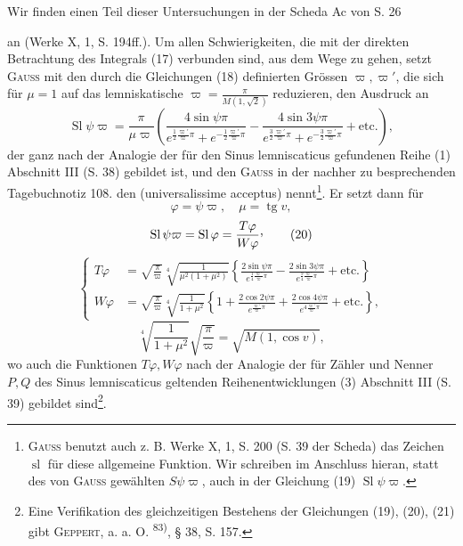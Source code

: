 Wir finden einen Teil dieser Untersuchungen in der Scheda Ac von S. 26\par
\clearpage{}
\HistoricalFoot{}{10\textsuperscript{\(\ast\)}}
\noindent an (Werke X, 1, S. 194ff.). Um allen Schwierigkeiten, die mit der direkten Betrachtung des Integrals (17) verbunden sind, aus dem Wege zu gehen, setzt \textsc{Gauss}
mit den durch die Gleichungen (18) definierten Grössen \(\varpi,\varpi'\), die sich für \(\mu=1\)
auf das lemniskatische \(\varpi=\frac\pi{M(1,\sqrt2)}\) reduzieren, den Ausdruck an
\begingroup\makeatletter\tagsleft@true\let\veqno\leqno\makeatother
\begin{equation*}
\operatorname{Sl}\psi\varpi=\frac\pi{\mu\varpi}\left(
\frac{4\sin\psi\pi}{e^{\frac12\frac{\varpi'}\varpi\pi}+e^{-\frac12\frac{\varpi'}\varpi\pi}}
-\frac{4\sin3\psi\pi}{e^{\frac32\frac{\varpi'}\varpi\pi}+e^{-\frac32\frac{\varpi'}\varpi\pi}}
+\text{etc.}\right),\tag{19}
\end{equation*}
\endgroup
\noindent der ganz nach der Analogie der für den Sinus lemniscaticus gefundenen
Reihe (1) Abschnitt III (S. 38) gebildet ist, und den \textsc{Gauss} in der nachher
zu besprechenden Tagebuchnotiz 108. den  (universalissime acceptus) nennt\footnote{\textsc{Gauss} benutzt auch z. B. Werke X, 1, S. 200 (S. 39 der Scheda) das Zeichen \(\operatorname{sl}\) für diese allgemeine Funktion. Wir schreiben im Anschluss hieran, statt des von \textsc{Gauss} gewählten \(S\psi\varpi\), auch in der Gleichung (19) \(\operatorname{Sl}\psi\varpi\).}. Er setzt dann für
\[
\varphi=\psi\varpi,\quad\mu=\operatorname{tg}v,
\]
\begingroup\makeatletter\tagsleft@true\let\veqno\leqno\makeatother
\begin{equation*}
\operatorname{Sl}\psi\varpi=\operatorname{Sl}\varphi=\frac{T\varphi}{W\varphi}\mathpunct{\vcenter{\hbox{,}}}\tag{20}
\end{equation*}
\begin{equation*}
\left\{\begin{aligned}
T\varphi&=\sqrt{\frac\pi\varpi}\sqrt[4]{\frac1{\mu^2(1+\mu^2)}}
\left\{\frac{2\sin\psi\pi}{e^{\frac14\frac{\varpi'}\varpi\pi}}-\frac{2\sin3\psi\pi}{e^{\frac94\frac{\varpi'}\varpi\pi}}+\text{etc.}\right\}\\[1.5ex]
W\varphi&=\sqrt{\frac\pi\varpi}\sqrt[4]{\frac1{1+\mu^2}}
\left\{1+\frac{2\cos2\psi\pi}{e^{\frac{\varpi'}\varpi\pi}}+\frac{2\cos4\psi\pi}{e^{4\frac{\varpi'}\varpi\pi}}+\text{etc.}\right\},
\end{aligned}\right.\tag{21}
\end{equation*}
\endgroup
\[
\sqrt[4]{\frac1{1+\mu^2}}\sqrt{\frac\pi\varpi}=\sqrt{M(1,\cos v)},
\]
\noindent wo auch die Funktionen \(T\varphi,W\varphi\) nach der Analogie der für Zähler und
Nenner \(P,Q\) des Sinus lemniscaticus geltenden Reihenentwicklungen (3) Abschnitt III (S. 39) gebildet sind\footnote{Eine Verifikation des gleichzeitigen Bestehens der Gleichungen (19), (20), (21) gibt \textsc{Geppert}, a. a. O. \textsuperscript{83)}, § 38, S. 157.}.

